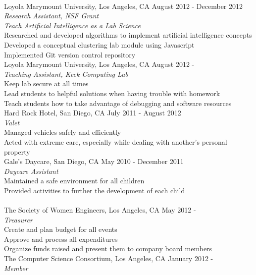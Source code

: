 \documentclass[11pt]{article}
\begin{document}
\vspace{1.5mm}\\
\indent Loyola Marymount University, Los Angeles, CA \hfill August 2012 - December 2012\\
\indent \emph{Research Assistant, NSF Grant}\\
\indent \indent \emph{Teach Artificial Intelligence as a Lab Science}\\
\indent \indent Researched and developed algorithms to implement artificial intelligence concepts\\
\indent \indent Developed a conceptual clustering lab module using Javascript\\
\indent \indent Implemented Git version control repository\vspace{2mm}\\
\indent Loyola Marymount University, Los Angeles, CA \hfill August 2012 -\\
\indent \emph{Teaching Assistant, Keck Computing Lab}\\
\indent \indent Keep lab secure at all times\\
\indent \indent Lead students to helpful solutions when having trouble with homework\\
\indent \indent Teach students how to take advantage of debugging and software resources\vspace{2mm}\\
\indent Hard Rock Hotel, San Diego, CA \hfill July 2011 - August 2012\\
\indent \emph{Valet}\\
\indent \indent Managed vehicles safely and efficiently\\
\indent \indent Acted with extreme care, especially while dealing with another's personal property\vspace{2mm}\\
\indent Gale’s Daycare, San Diego, CA \hfill May 2010 - December 2011\\
\indent \emph{Daycare Assistant}\\
\indent \indent Maintained a safe environment for all children\\
\indent \indent Provided activities to further the development of each child\\

\vspace{1.5mm}\\
\indent The Society of Women Engineers, Los Angeles, CA \hfill May 2012 -\\
\indent \emph{Treasurer}\\
\indent \indent Create and plan budget for all events\\
\indent \indent Approve and process all expenditures\\
\indent \indent Organize funds raised and present them to company board members\vspace{2mm}\\
\indent The Computer Science Consortium, Los Angeles, CA \hfill January 2012 -\\
\indent \emph{Member}
\end{document}
